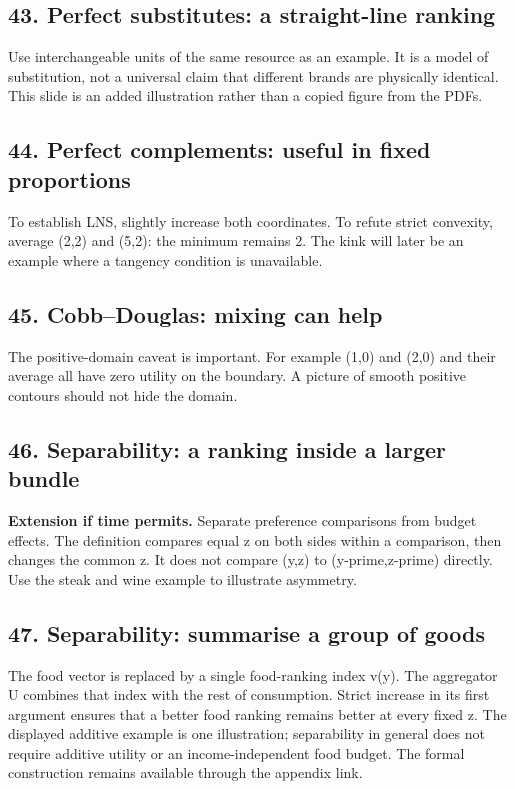 \documentclass[11pt,a4paper]{article}
\begin{document}
\subsection*{43. Perfect substitutes: a straight-line ranking}
Use interchangeable units of the same resource as an example. It is a model of substitution, not a universal claim that different brands are physically identical. This slide is an added illustration rather than a copied figure from the PDFs.

\subsection*{44. Perfect complements: useful in fixed proportions}
To establish LNS, slightly increase both coordinates. To refute strict convexity, average (2,2) and (5,2): the minimum remains 2. The kink will later be an example where a tangency condition is unavailable.

\subsection*{45. Cobb--Douglas: mixing can help}
The positive-domain caveat is important. For example (1,0) and (2,0) and their average all have zero utility on the boundary. A picture of smooth positive contours should not hide the domain.

\subsection*{46. Separability: a ranking inside a larger bundle}
\textbf{Extension if time permits.} Separate preference comparisons from budget effects. The definition compares equal z on both sides within a comparison, then changes the common z. It does not compare (y,z) to (y-prime,z-prime) directly. Use the steak and wine example to illustrate asymmetry.

\subsection*{47. Separability: summarise a group of goods}
The food vector is replaced by a single food-ranking index v(y). The aggregator U combines that index with the rest of consumption. Strict increase in its first argument ensures that a better food ranking remains better at every fixed z. The displayed additive example is one illustration; separability in general does not require additive utility or an income-independent food budget. The formal construction remains available through the appendix link.
\end{document}
